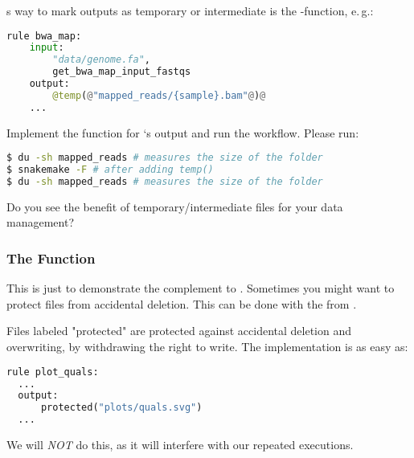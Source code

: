 \begin{frame}[fragile]
  \frametitle{}
  \Snakemake{}s way to mark outputs as temporary or intermediate is the -function, e.\,g.:
  \begin{lstlisting}[language=Python,style=Python]
rule bwa_map:
    input:
        "data/genome.fa",
        get_bwa_map_input_fastqs
    output:
        @temp(@"mapped_reads/{sample}.bam"@)@
    ...
  \end{lstlisting}
  \pause
  Implement the  function for `s output and run the workflow. Please run:
  \begin{lstlisting}[language=Bash, style=Shell]
$ du -sh mapped_reads # measures the size of the folder
$ snakemake -F # after adding temp()
$ du -sh mapped_reads # measures the size of the folder
  \end{lstlisting}
  \pause
  \bcquestion Do you see the benefit of temporary/intermediate files for your data management?
\end{frame}

\begin{frame}[fragile]
  \frametitle{The  Function}
  \begin{hint}
  	This is just to demonstrate the complement to . Sometimes you might want to protect files from accidental deletion. This can be done with the  from \Snakemake.
  \end{hint}
  \pause
  Files labeled "protected" are protected against accidental deletion and overwriting, by withdrawing the right to write. The implementation is as easy as:
  \begin{lstlisting}[language=Python,style=Python]
rule plot_quals:
  ...
  output: 
      protected("plots/quals.svg")
  ...
  \end{lstlisting}
  \pause
  \begin{hint}
  	We will \emph{NOT} do this, as it will interfere with our repeated executions.
  \end{hint}	
\end{frame} 

